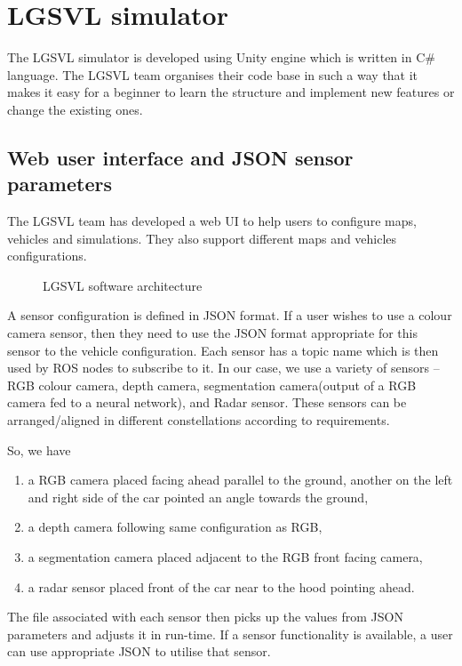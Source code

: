 \section{LGSVL simulator}
The LGSVL simulator is developed using Unity engine which is written in C\# language.
The LGSVL team organises their code base\cite{lgsvlgithub} in such a way that it makes it
easy for a beginner to learn the structure and implement new features or change the
existing ones.
\subsection{Web user interface and JSON sensor parameters}
The LGSVL team has developed a web UI to help users to configure maps, vehicles and
simulations. They also support different maps and vehicles configurations.
\begin{figure}
	\centering
    \def\svgwidth{0.8\textwidth}
    \caption{LGSVL software architecture}
    \label{fig:lgsvlswarchitecture}
\end{figure}
A sensor configuration is defined in JSON format. If a user wishes to use a colour camera
sensor, then they need to use the JSON format appropriate for this sensor to the vehicle
configuration. Each sensor has a topic name which is then used by ROS nodes to subscribe
to it. In our case, we use a variety of sensors -- RGB colour camera, depth camera,
segmentation camera(output of a RGB camera fed to a neural network), and Radar sensor.
These sensors can be arranged/aligned in different constellations according to
requirements.

So, we have

\begin{enumerate}

    \item a RGB camera placed facing ahead parallel to the ground, another on
the left and right side of the car pointed an angle towards the ground,
    \item a depth camera following same configuration as RGB,
    \item a segmentation camera placed adjacent to the RGB front facing camera,
    \item a radar sensor placed front of the car near to the hood pointing ahead.
\end{enumerate}

The file associated with each sensor then picks up the values from JSON parameters and adjusts it in
run-time. If a sensor functionality is available, a user can use appropriate JSON to
utilise that sensor.

